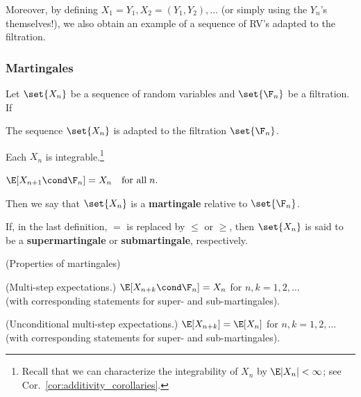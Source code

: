 \documentclass{article} %
\begin{document}
\begin{example}
Moreover, by defining $X_1=Y_1, X_2=(Y_1,Y_2), \hdots$ (or simply using the $Y_n$'s themselves!), we also obtain an example of a sequence of RV's adapted to the filtration.	
\label{ex:filtration_generated_by_projecting_random_sequences_of_binary_values_onto_their_first_n_coordinates}
\end{example}

\subsubsection{Martingales}

\begin{definition}
Let $\set{X_n}$ be a sequence of random variables  and $\set{\F_n}$ be a filtration.    If
%
\begin{alphabate}
\item The sequence $\set{X_n}$ is adapted to the filtration $\set{\F_n}$.
\item Each $X_n$ is integrable.\footnote{Recall that we can characterize the integrability of $X_n$ by $\E|X_n| < \infty$; see Cor.~\ref{cor:additivity_corollaries}.}
\item $\E[X_{n+1} \cond \F_n] = X_n \quad \text{for all} \; n.$
\end{alphabate}
%
Then we say that $\set{X_n}$ is a \textbf{martingale} relative to $\set{\F_n}$.  

If, in the last definition, $=$ is replaced by $\leq$ or $\geq$, then $\set{X_n}$ is said to be a \textbf{supermartingale} or \textbf{submartingale}, respectively.
\label{def:martingale_supermartingale_and_submartingale}
\end{definition}

\begin{proposition}\textnormal{(Properties of martingales)}

\begin{alphabate}
\item \textnormal{(Multi-step expectations.)}  \; $\E[X_{n+k} \cond \F_n] = X_n$ \quad for \quad $n,k=1,2,\hdots$ \\
(with corresponding statements for super- and sub-martingales).
\item \textnormal{(Unconditional multi-step expectations.)} \; $\E[X_{n+k}] = \E[X_n]$ \quad for \quad $n,k=1,2,\hdots$ \\
(with corresponding statements for super- and sub-martingales).
\end{alphabate}
\end{proposition}
\end{document}
